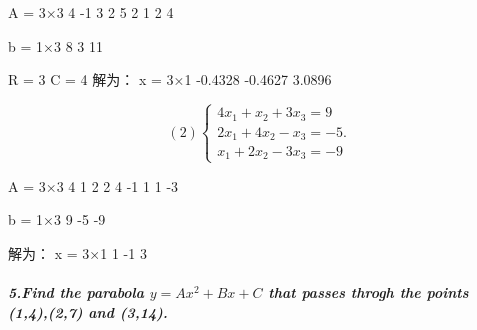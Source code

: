 \documentclass[
]{article}
\newenvironment{Shaded}{}{}
\newcommand{\FloatTok}[1]{\textcolor[rgb]{0.25,0.63,0.44}{#1}}
\newcommand{\NormalTok}[1]{#1}
\newcommand{\OperatorTok}[1]{\textcolor[rgb]{0.40,0.40,0.40}{#1}}
\newcommand{\VariableTok}[1]{\textcolor[rgb]{0.10,0.09,0.49}{#1}}
\begin{document}
\begin{Shaded}
\begin{Highlighting}[]
\VariableTok{A} \OperatorTok{=} \FloatTok{3}\NormalTok{×}\FloatTok{3}    
     \FloatTok{4}    \OperatorTok{{-}}\FloatTok{1}     \FloatTok{3}
     \FloatTok{2}     \FloatTok{5}     \FloatTok{2}
     \FloatTok{1}     \FloatTok{2}     \FloatTok{4}

\VariableTok{b} \OperatorTok{=} \FloatTok{1}\NormalTok{×}\FloatTok{3}    
     \FloatTok{8}     \FloatTok{3}    \FloatTok{11}

\VariableTok{R} \OperatorTok{=} \FloatTok{3}
\VariableTok{C} \OperatorTok{=} \FloatTok{4}
\NormalTok{解为：}
\VariableTok{x} \OperatorTok{=} \FloatTok{3}\NormalTok{×}\FloatTok{1}    
   \OperatorTok{{-}}\FloatTok{0.4328}
   \OperatorTok{{-}}\FloatTok{0.4627}
    \FloatTok{3.0896}
\end{Highlighting}
\end{Shaded}

\[(2)\left\{\begin{matrix} 
  4x_{1}+x_{2}+3x_{3}=9 \\  
  2x_{1}+4x_{2}-x_{3}=-5.\\
  x_{1}+2x_{2}-3x_{3}=-9
\end{matrix}\right.\]

\begin{Shaded}
\begin{Highlighting}[]
\VariableTok{A} \OperatorTok{=} \FloatTok{3}\NormalTok{×}\FloatTok{3}    
     \FloatTok{4}     \FloatTok{1}     \FloatTok{2}
     \FloatTok{2}     \FloatTok{4}    \OperatorTok{{-}}\FloatTok{1}
     \FloatTok{1}     \FloatTok{1}    \OperatorTok{{-}}\FloatTok{3}

\VariableTok{b} \OperatorTok{=} \FloatTok{1}\NormalTok{×}\FloatTok{3}    
     \FloatTok{9}    \OperatorTok{{-}}\FloatTok{5}    \OperatorTok{{-}}\FloatTok{9}

\NormalTok{解为：}
\VariableTok{x} \OperatorTok{=} \FloatTok{3}\NormalTok{×}\FloatTok{1}    
     \FloatTok{1}
    \OperatorTok{{-}}\FloatTok{1}
     \FloatTok{3}
\end{Highlighting}
\end{Shaded}

\hypertarget{5find-the-parabola-uxayuxauxaauxaxuxa2uxauxabuxaxuxauxacuxa-that-passes-throgh-the-points-1427-and-314}{%
\subparagraph{\texorpdfstring{5.Find the parabola \(y=Ax^{2}+Bx+C\) that
passes throgh the points (1,4),(2,7) and
(3,14).}{5.Find the parabola y=Ax\^{}\{2\}+Bx+C that passes throgh the points (1,4),(2,7) and (3,14).}}\label{5find-the-parabola-uxayuxauxaauxaxuxa2uxauxabuxaxuxauxacuxa-that-passes-throgh-the-points-1427-and-314}}
\end{document}
